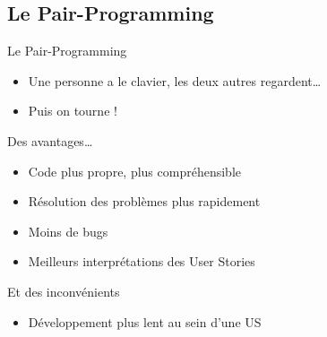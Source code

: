 \FlorentSpeak
\subsection{Le Pair-Programming}
\begin{frame}{Le Pair-Programming}
	\begin{itemize}
		\item Une personne a le clavier, les deux autres regardent…
		\item Puis on tourne !
	\end{itemize}
	\vfill
	\pause
	\begin{exampleblock}{Des avantages…}
		\begin{itemize}
			\item Code plus propre, plus compréhensible
			\item Résolution des problèmes plus rapidement
			\item Moins de bugs
			\item Meilleurs interprétations des User Stories 
		\end{itemize}
\end{exampleblock}
	\pause
\vfill
\begin{alertblock}{Et des inconvénients}
\begin{itemize}
	\item Développement plus lent au sein d'une US
\end{itemize}
\end{alertblock}
\end{frame}
	

